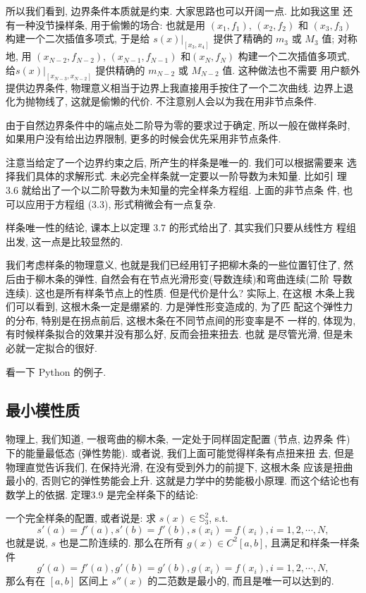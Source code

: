 \documentclass[a4paper]{ctexart}
\begin{document}
所以我们看到, 边界条件本质就是约束. 大家思路也可以开阔一点. 比如我这里
还有一种没节操样条, 用于偷懒的场合: 也就是用 $(x_1, f_1)$, $(x_2,
f_2)$ 和 $(x_3, f_3)$ 构建一个二次插值多项式, 于是给
$\left.s(x)\right|_{[x_3, x_4]}$ 提供了精确的 $m_3$ 或 $M_3$ 值; 对称
地, 用 $(x_{N - 2}, f_{N - 2})$, $(x_{N - 1}, f_{N - 1})$ 和$(x_N,
f_N)$ 构建一个二次插值多项式, 给$\left.s(x)\right|_{[x_{N - 3}, x_{N -
      2}]}$ 提供精确的 $m_{N - 2}$ 或 $M_{N - 2}$ 值. 这种做法也不需要
用户额外提供边界条件, 物理意义相当于边界上我直接用手按住了一个二次曲线.
边界上退化为抛物线了, 这就是偷懒的代价. 不注意别人会以为我在用非节点条件. 

由于自然边界条件中的端点处二阶导为零的要求过于确定, 所以一般在做样条时, 
如果用户没有给出边界限制, 更多的时候会优先采用非节点条件. 

注意当给定了一个边界约束之后, 所产生的样条是唯一的. 我们可以根据需要来
选择我们具体的求解形式. 未必完全样条就一定要以一阶导数为未知量. 比如引
理 3.6 就给出了一个以二阶导数为未知量的完全样条方程组. 上面的非节点条
件, 也可以应用于方程组 (3.3), 形式稍微会有一点复杂.

样条唯一性的结论, 课本上以定理 3.7 的形式给出了. 其实我们只要从线性方
程组出发, 这一点是比较显然的. 

我们考虑样条的物理意义, 也就是我们已经用钉子把柳木条的一些位置钉住了,
然后由于柳木条的弹性, 自然会有在节点光滑形变(导数连续)和弯曲连续(二阶
导数连续). 这也是所有样条节点上的性质. 但是代价是什么? 实际上, 在这根
木条上我们可以看到, 这根木条一定是绷紧的. 力是弹性形变造成的, 为了匹
配这个弹性力的分布, 特别是在拐点前后, 这根木条在不同节点间的形变率是不
一样的, 体现为, 有时候样条拟合的效果并没有那么好, 反而会扭来扭去. 也就
是尽管光滑, 但是未必就一定拟合的很好.

看一下 Python 的例子.

\subsection{最小模性质}

物理上, 我们知道, 一根弯曲的柳木条, 一定处于同样固定配置 (节点, 边界条
件) 下的能量最低态 (弹性势能). 或者说, 我们上面可能觉得样条有点扭来扭
去, 但是物理直觉告诉我们, 在保持光滑, 在没有受到外力的前提下, 这根木条
应该是扭曲最小的, 否则它的弹性势能会上升. 这就是力学中的势能极小原理.
而这个结论也有数学上的依据. 定理3.9 是完全样条下的结论:

一个完全样条的配置, 或者说是: 求 $s(x) \in \mathbb{S}_3^2$, s.t. 
$$
s'(a) = f'(a), s'(b) = f'(b), s(x_i) = f(x_i), i = 1, 2, \cdots, N, 
$$
也就是说, $s$ 也是二阶连续的. 那么在所有 $g(x) \in C^2[a, b]$, 且满足和样条一样条件
$$
g'(a) = f'(a), g'(b) = g'(b), g(x_i) = f(x_i), i = 1, 2, \cdots, N, 
$$
那么有在 $[a, b]$ 区间上 $s''(x)$ 的二范数是最小的, 而且是唯一可以达到的. 
\end{document}
